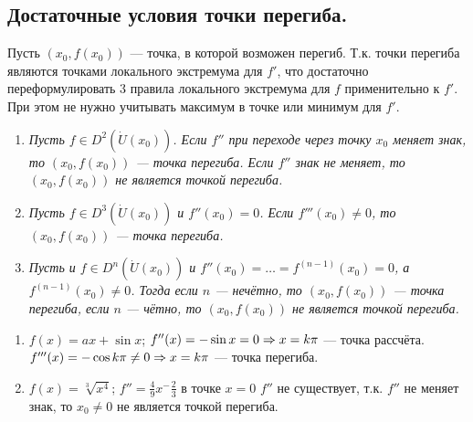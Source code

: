 \subsection{Достаточные условия точки перегиба.}
Пусть $(x_{0}, f(x_{0}))$ --- точка, в которой возможен перегиб. Т.к. точки перегиба являются точками локального экстремума для $f'$, что достаточно переформулировать 3 правила локального экстремума для $f$ применительно к $f'$. При этом не нужно учитывать максимум в точке или минимум для $f'$. \\
\begin{enumerate}
	\item  \textit{Пусть $f \in D^2(\dot{U}(x_{0}))$. Если $f''$ при переходе через точку $x_{0}$ меняет знак, то $(x_{0}, f(x_{0}))$ --- точка перегиба. Если $f''$ знак не меняет, то $(x_{0}, f(x_{0}))$ не является точкой перегиба.} \\
	\item \textit{Пусть $f \in D^3(\dot{U}(x_{0}))$ и $f''(x_{0}) = 0$. Если $f'''(x_{0}) \neq 0$, то $(x_{0}, f(x_{0}))$ --- точка перегиба.} \\
	\item \textit{Пусть и $f \in D^n(\dot{U}(x_{0}))$ и $f''(x_{0}) = \ldots = f^{(n-1)}(x_{0}) = 0$, а $f^{(n-1)}(x_{0}) \neq 0$. Тогда если $n$ --- нечётно, то  $(x_{0}, f(x_{0}))$ --- точка перегиба, если $n$ --- чётно, то  $(x_{0}, f(x_{0}))$ не является точкой перегиба.}
\end{enumerate}
\begin{example}
	\begin{enumerate}
		\item $f(x) = ax + \sin{x}$; $f''(x) = -\sin{x} = 0 \Rightarrow x = k\pi$ --- точка рассчёта. $f'''(x) = -\cos{k\pi} \neq 0 \Rightarrow x = k\pi$ --- точка перегиба.
		\item $f(x) = \sqrt[3]{x^4}$; $f'' = \frac{4}{9}x^-\frac{2}{3}$ в точке $x = 0$  $f''$ не существует, т.к. $f''$ не меняет знак, то $x_{0} \neq 0$ не является точкой перегиба.
	\end{enumerate}
\end{example}
